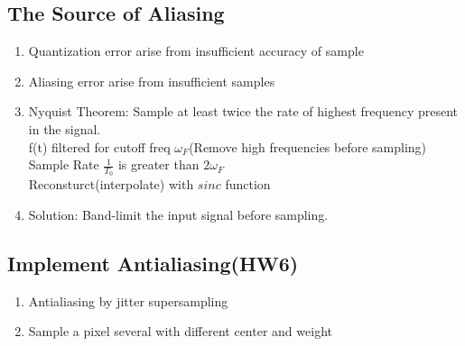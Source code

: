\documentclass[geye,cyan,normal,en]{elegantnote}
\begin{document}
\subsection{The Source of Aliasing}
\begin{enumerate}
	\item Quantization error arise from insufficient accuracy of sample
	\item Aliasing error arise from insufficient samples
	\item Nyquist Theorem: Sample at least twice the rate of highest frequency present in the signal.\\
	f(t) filtered for cutoff freq $\omega_F$(Remove high frequencies before sampling)\\
	Sample Rate $\frac{1}{T_0}$ is greater than $2\omega_F$\\
	Reconsturct(interpolate) with $sinc$ function
	\item Solution: Band-limit the input signal before sampling.
\end{enumerate}
\subsection{Implement Antialiasing(HW6)}
\begin{enumerate}
	\item Antialiasing by jitter supersampling
	\item Sample a pixel several with different center and weight
\end{enumerate}
\end{document}
